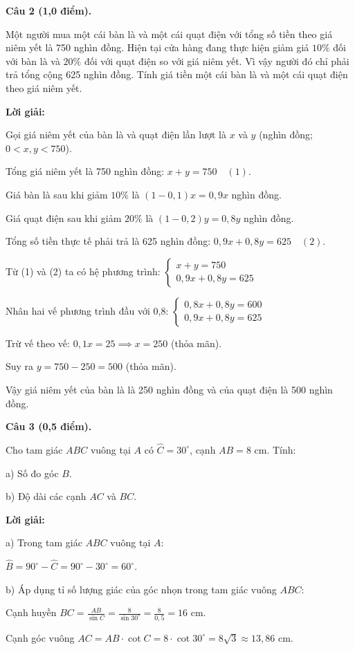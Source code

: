 \documentclass[12pt,a4paper]{article}
\begin{document}
\vspace{3mm}
\noindent\textbf{Câu 2 (1,0 điểm).}

Một người mua một cái bàn là và một cái quạt điện với tổng số tiền theo giá niêm yết là 750 nghìn đồng. Hiện tại cửa hàng đang thực hiện giảm giá $10\%$ đối với bàn là và $20\%$ đối với quạt điện so với giá niêm yết. Vì vậy người đó chỉ phải trả tổng cộng 625 nghìn đồng. Tính giá tiền một cái bàn là và một cái quạt điện theo giá niêm yết.

\noindent\textbf{Lời giải:}

Gọi giá niêm yết của bàn là và quạt điện lần lượt là $x$ và $y$ (nghìn đồng; $0 < x, y < 750$).\par Tổng giá niêm yết là 750 nghìn đồng: $x + y = 750 \quad (1)$.\par Giá bàn là sau khi giảm $10\%$ là $(1 - 0{,}1)x = 0{,}9x$ nghìn đồng.\par Giá quạt điện sau khi giảm $20\%$ là $(1 - 0{,}2)y = 0{,}8y$ nghìn đồng.\par Tổng số tiền thực tế phải trả là 625 nghìn đồng: $0{,}9x + 0{,}8y = 625 \quad (2)$.\par Từ (1) và (2) ta có hệ phương trình: $\begin{cases} x + y = 750 \\ 0{,}9x + 0{,}8y = 625 \end{cases}$\par Nhân hai vế phương trình đầu với 0,8: $\begin{cases} 0{,}8x + 0{,}8y = 600 \\ 0{,}9x + 0{,}8y = 625 \end{cases}$\par Trừ vế theo vế: $0{,}1x = 25 \implies x = 250$ (thỏa mãn).\par Suy ra $y = 750 - 250 = 500$ (thỏa mãn).\par Vậy giá niêm yết của bàn là là 250 nghìn đồng và của quạt điện là 500 nghìn đồng.

\vspace{3mm}
\newpage
\noindent\textbf{Câu 3 (0,5 điểm).}

Cho tam giác $ABC$ vuông tại $A$ có $\widehat{C} = 30^\circ$, cạnh $AB = 8\text{ cm}$. Tính:\par a) Số đo góc $B$.\par b) Độ dài các cạnh $AC$ và $BC$.

\noindent\textbf{Lời giải:}

a) Trong tam giác $ABC$ vuông tại $A$:\par $\widehat{B} = 90^\circ - \widehat{C} = 90^\circ - 30^\circ = 60^\circ$.\par b) Áp dụng tỉ số lượng giác của góc nhọn trong tam giác vuông $ABC$:\par Cạnh huyền $BC = \frac{AB}{\sin C} = \frac{8}{\sin 30^\circ} = \frac{8}{0{,}5} = 16\text{ cm}$.\par Cạnh góc vuông $AC = AB \cdot \cot C = 8 \cdot \cot 30^\circ = 8\sqrt{3} \approx 13{,}86\text{ cm}$.
\end{document}
